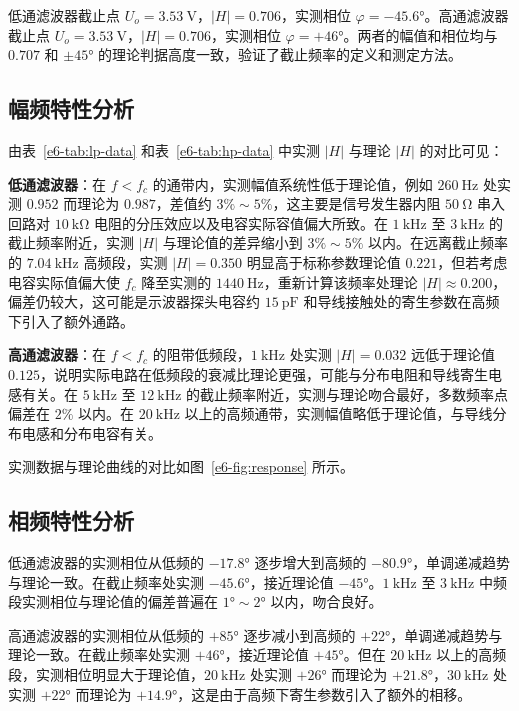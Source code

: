 低通滤波器截止点 \(U_o=\SI{3.53}{\volt}\)，\(|H|=0.706\)，实测相位 \(\varphi=-45.6°\)。高通滤波器截止点 \(U_o=\SI{3.53}{\volt}\)，\(|H|=0.706\)，实测相位 \(\varphi=+46°\)。两者的幅值和相位均与 \(0.707\) 和 \(\pm45°\) 的理论判据高度一致，验证了截止频率的定义和测定方法。

\subsection{幅频特性分析}

由表~\ref{e6-tab:lp-data} 和表~\ref{e6-tab:hp-data} 中实测 \(|H|\) 与理论 \(|H|\) 的对比可见：

\textbf{低通滤波器}：在 \(f < f_c\) 的通带内，实测幅值系统性低于理论值，例如 \(\SI{260}{\hertz}\) 处实测 \(0.952\) 而理论为 \(0.987\)，差值约 \(3\%\sim5\%\)，这主要是信号发生器内阻 \(\SI{50}{\ohm}\) 串入回路对 \(\SI{10}{\kilo\ohm}\) 电阻的分压效应以及电容实际容值偏大所致。在 \(\SI{1}{\kilo\hertz}\) 至 \(\SI{3}{\kilo\hertz}\) 的截止频率附近，实测 \(|H|\) 与理论值的差异缩小到 \(3\%\sim5\%\) 以内。在远离截止频率的 \(\SI{7.04}{\kilo\hertz}\) 高频段，实测 \(|H|=0.350\) 明显高于标称参数理论值 \(0.221\)，但若考虑电容实际值偏大使 \(f_c\) 降至实测的 \(\SI{1440}{\hertz}\)，重新计算该频率处理论 \(|H|\approx0.200\)，偏差仍较大，这可能是示波器探头电容约 \(\SI{15}{\pico\farad}\) 和导线接触处的寄生参数在高频下引入了额外通路。

\textbf{高通滤波器}：在 \(f < f_c\) 的阻带低频段，\(\SI{1}{\kilo\hertz}\) 处实测 \(|H|=0.032\) 远低于理论值 \(0.125\)，说明实际电路在低频段的衰减比理论更强，可能与分布电阻和导线寄生电感有关。在 \(\SI{5}{\kilo\hertz}\) 至 \(\SI{12}{\kilo\hertz}\) 的截止频率附近，实测与理论吻合最好，多数频率点偏差在 \(2\%\) 以内。在 \(\SI{20}{\kilo\hertz}\) 以上的高频通带，实测幅值略低于理论值，与导线分布电感和分布电容有关。

实测数据与理论曲线的对比如图~\ref{e6-fig:response} 所示。

\subsection{相频特性分析}

低通滤波器的实测相位从低频的 \(-17.8°\) 逐步增大到高频的 \(-80.9°\)，单调递减趋势与理论一致。在截止频率处实测 \(-45.6°\)，接近理论值 \(-45°\)。\(\SI{1}{\kilo\hertz}\) 至 \(\SI{3}{\kilo\hertz}\) 中频段实测相位与理论值的偏差普遍在 \(1°\sim2°\) 以内，吻合良好。

高通滤波器的实测相位从低频的 \(+85°\) 逐步减小到高频的 \(+22°\)，单调递减趋势与理论一致。在截止频率处实测 \(+46°\)，接近理论值 \(+45°\)。但在 \(\SI{20}{\kilo\hertz}\) 以上的高频段，实测相位明显大于理论值，\(\SI{20}{\kilo\hertz}\) 处实测 \(+26°\) 而理论为 \(+21.8°\)，\(\SI{30}{\kilo\hertz}\) 处实测 \(+22°\) 而理论为 \(+14.9°\)，这是由于高频下寄生参数引入了额外的相移。

